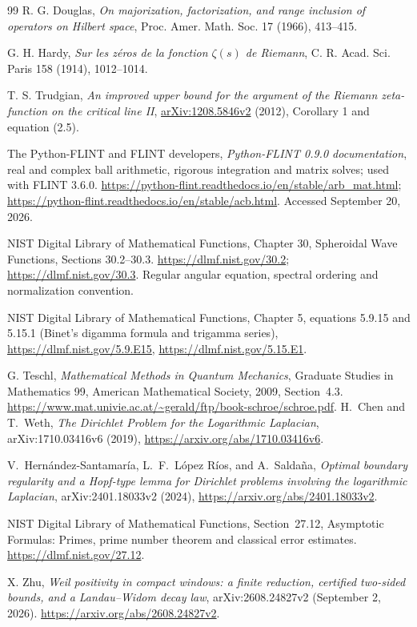 \documentclass[11pt]{article}
\theoremstyle{remark}
\begin{document}
\begin{thebibliography}{99}
R. G. Douglas,
\emph{On majorization, factorization, and range inclusion of operators on Hilbert space},
Proc. Amer. Math. Soc. 17 (1966), 413--415.

G. H. Hardy, \emph{Sur les z\'eros de la fonction $\zeta(s)$ de Riemann},
C. R. Acad. Sci. Paris 158 (1914), 1012--1014.

T. S. Trudgian,
\emph{An improved upper bound for the argument of the Riemann
zeta-function on the critical line II},
\href{https://arxiv.org/abs/1208.5846v2}{arXiv:1208.5846v2} (2012),
Corollary 1 and equation (2.5).

The Python-FLINT and FLINT developers,
\emph{Python-FLINT 0.9.0 documentation}, real and complex ball arithmetic,
rigorous integration and matrix solves; used with FLINT 3.6.0.
\url{https://python-flint.readthedocs.io/en/stable/arb_mat.html};
\url{https://python-flint.readthedocs.io/en/stable/acb.html}.
Accessed September 20, 2026.

NIST Digital Library of Mathematical Functions, Chapter 30,
Spheroidal Wave Functions, Sections 30.2--30.3.
\url{https://dlmf.nist.gov/30.2};
\url{https://dlmf.nist.gov/30.3}.
Regular angular equation, spectral ordering and normalization convention.

NIST Digital Library of Mathematical Functions, Chapter 5,
equations 5.9.15 and 5.15.1 (Binet's digamma formula and trigamma series),
\url{https://dlmf.nist.gov/5.9.E15},
\url{https://dlmf.nist.gov/5.15.E1}.

G. Teschl, \emph{Mathematical Methods in Quantum Mechanics},
Graduate Studies in Mathematics 99, American Mathematical Society, 2009,
Section~4.3.
\url{https://www.mat.univie.ac.at/~gerald/ftp/book-schroe/schroe.pdf}.
H.~Chen and T.~Weth,
\emph{The Dirichlet Problem for the Logarithmic Laplacian},
arXiv:1710.03416v6 (2019),
\url{https://arxiv.org/abs/1710.03416v6}.

V.~Hern\'andez-Santamar\'ia, L.~F.~L\'opez R\'ios, and A.~Salda\~na,
\emph{Optimal boundary regularity and a Hopf-type lemma for Dirichlet
problems involving the logarithmic Laplacian},
arXiv:2401.18033v2 (2024),
\url{https://arxiv.org/abs/2401.18033v2}.

NIST Digital Library of Mathematical Functions, Section~27.12,
Asymptotic Formulas: Primes, prime number theorem and classical error
estimates. \url{https://dlmf.nist.gov/27.12}.

X. Zhu, \emph{Weil positivity in compact windows: a finite reduction,
certified two-sided bounds, and a Landau--Widom decay law},
arXiv:2608.24827v2 (September 2, 2026).
\url{https://arxiv.org/abs/2608.24827v2}.

\end{thebibliography}
\end{document}
